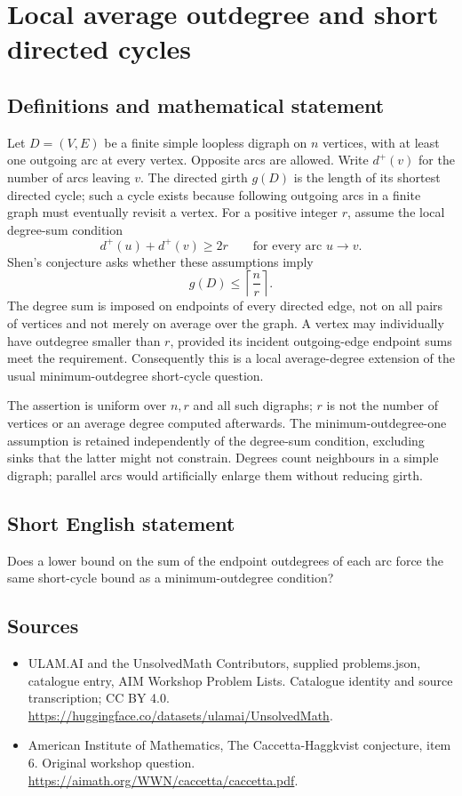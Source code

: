 \documentclass[11pt,a4paper]{article}
\begin{document}
\section*{Local average outdegree and short directed cycles}\label{statement}

\subsection{Definitions and mathematical statement}
Let $D=(V,E)$ be a finite simple loopless digraph on $n$ vertices,
with at least one outgoing arc at every vertex. Opposite arcs are
allowed. Write $d^+(v)$ for the number of arcs leaving $v$.
The directed girth $g(D)$ is the length of its shortest directed
cycle; such a cycle exists because following outgoing arcs in a
finite graph must eventually revisit a vertex.
For a positive integer $r$, assume the local degree-sum condition
\[
                       d^+(u)+d^+(v)\ge2r
                              \qquad\text{for every arc }u\to v.
\]
Shen's conjecture asks whether these assumptions imply
\[
                              g(D)\le\left\lceil\frac nr\right\rceil.
\]
The degree sum is imposed on endpoints of every directed edge, not
on all pairs of vertices and not merely on average over the graph.
A vertex may individually have outdegree smaller than $r$, provided
its incident outgoing-edge endpoint sums meet the requirement.
Consequently this is a local average-degree extension of the usual
minimum-outdegree short-cycle question.

The assertion is uniform over $n,r$ and all such digraphs; $r$ is not
the number of vertices or an average degree computed afterwards.
The minimum-outdegree-one assumption is retained independently of the
degree-sum condition, excluding sinks that the latter might not
constrain. Degrees count neighbours in a simple digraph; parallel
arcs would artificially enlarge them without reducing girth.
\subsection{Short English statement}
Does a lower bound on the sum of the endpoint outdegrees of each arc force the same short-cycle bound as a minimum-outdegree condition?
\subsection{Sources}
\begin{itemize}
\item[S1] ULAM.AI and the UnsolvedMath Contributors, supplied problems.json, catalogue entry, AIM Workshop Problem Lists. Catalogue identity and source transcription; CC BY 4.0.
\url{https://huggingface.co/datasets/ulamai/UnsolvedMath}.
\item[S2] American Institute of Mathematics, The Caccetta-Haggkvist conjecture, item 6. Original workshop question.
\url{https://aimath.org/WWN/caccetta/caccetta.pdf}.
\end{itemize}
\end{document}
